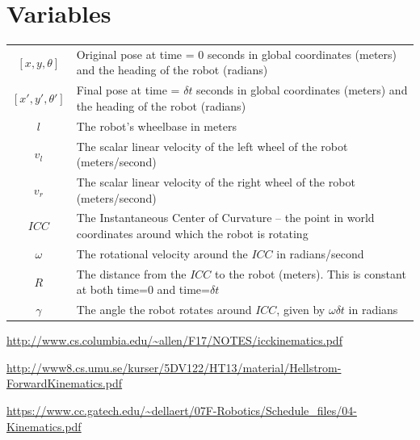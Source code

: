 \documentclass[11pt]{article}
\begin{document}
\section{Variables}

    \begin{tabular}{c p{8cm}}
        $[x, y, \theta]$ & Original pose at time = 0 seconds in global coordinates (meters) and the heading of the robot (radians) \\
        $[x', y', \theta']$ & Final pose at time = $\delta t$ seconds in global coordinates (meters) and the heading of the robot (radians) \\
        $l$ & The robot's wheelbase in meters \\
        $v_l$ & The scalar linear velocity of the left wheel of the robot (meters/second) \\
        $v_r$ & The scalar linear velocity of the right wheel of the robot (meters/second) \\ 
        $ICC$ & The Instantaneous Center of Curvature -- the point in world coordinates around which the robot is rotating \\
        $\omega$ & The rotational velocity around the $ICC$ in radians/second \\
        $R$ & The distance from the $ICC$ to the robot (meters). This is constant at both time=0 and time=$\delta t$\\
        $\gamma$ & The angle the robot rotates around $ICC$, given by $\omega\delta t$ in radians
    \end{tabular}

\begin{thebibliography}{10}
\url{http://www.cs.columbia.edu/~allen/F17/NOTES/icckinematics.pdf}

\url{http://www8.cs.umu.se/kurser/5DV122/HT13/material/Hellstrom-ForwardKinematics.pdf}

\url{https://www.cc.gatech.edu/~dellaert/07F-Robotics/Schedule_files/04-Kinematics.pdf}
\end{thebibliography}
\end{document}
